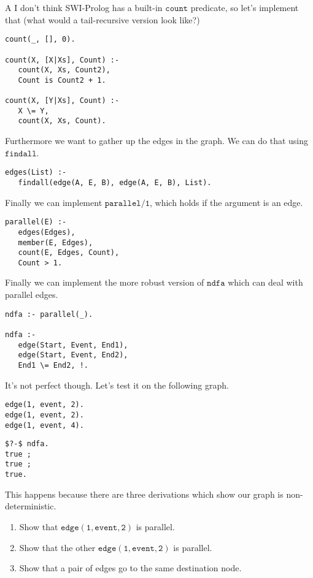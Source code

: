 \documentclass[a4paper,12pt]{article}
\newcommand{\kwa}[1]{\mathtt{#1}}
\begin{document}
\noindent
A I don't think SWI-Prolog has a built-in $\kwa{count}$ predicate, so let's implement that (what would a tail-recursive version look like?)

\begin{lstlisting}
count(_, [], 0).

count(X, [X|Xs], Count) :-
   count(X, Xs, Count2),
   Count is Count2 + 1.
   
count(X, [Y|Xs], Count) :-
   X \= Y,
   count(X, Xs, Count).
\end{lstlisting}

\noindent
Furthermore we want to gather up the edges in the graph. We can do that using $\kwa{findall}$.

\begin{lstlisting}
edges(List) :-
   findall(edge(A, E, B), edge(A, E, B), List).
\end{lstlisting}

\noindent
Finally we can implement $\kwa{parallel \slash 1}$, which holds if the argument is an edge.

\begin{lstlisting}
parallel(E) :-
   edges(Edges),
   member(E, Edges),
   count(E, Edges, Count),
   Count > 1.
\end{lstlisting}

\noindent
Finally we can implement the more robust version of $\kwa{ndfa}$ which can deal with parallel edges.

\begin{lstlisting}
ndfa :- parallel(_).

ndfa :-
   edge(Start, Event, End1),
   edge(Start, Event, End2),
   End1 \= End2, !.
\end{lstlisting}

\noindent
It's not perfect though. Let's test it on the following graph.

\begin{lstlisting}
edge(1, event, 2).
edge(1, event, 2).
edge(1, event, 4).
\end{lstlisting}

\begin{lstlisting}
$?-$ ndfa.
true ;
true ;
true.
\end{lstlisting}

\noindent
This happens because there are three derivations which show our graph is non-deterministic.

\begin{enumerate}
	\item Show that $\kwa{edge(1, event, 2)}$ is parallel.
	\item Show that the other $\kwa{edge(1, event, 2)}$ is parallel.
	\item Show that a pair of edges go to the same destination node.
\end{enumerate}
\end{document}
